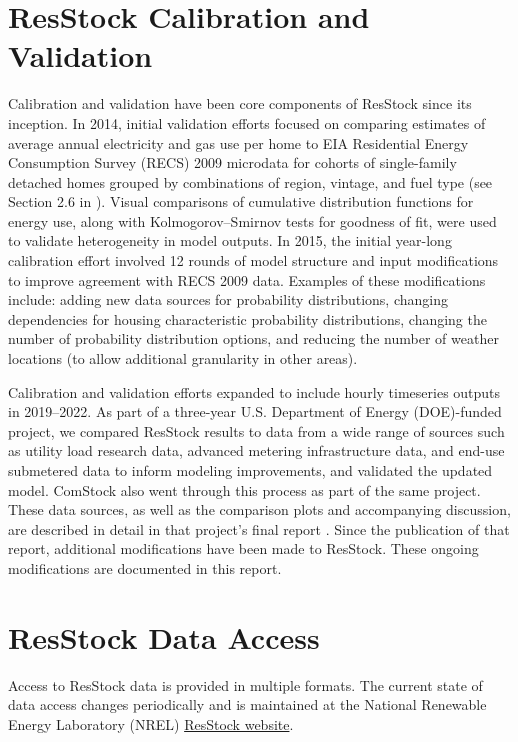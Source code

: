 \section{ResStock Calibration and Validation}
Calibration and validation have been core components of ResStock since its inception. In 2014, initial validation efforts focused on comparing estimates of average annual electricity and gas use per home to EIA Residential Energy Consumption Survey (RECS) 2009 microdata for cohorts of single-family detached homes grouped by combinations of region, vintage, and fuel type (see Section 2.6 in \cite{Wilson2017}). Visual comparisons of cumulative distribution functions for energy use, along with Kolmogorov–Smirnov tests for goodness of fit, were used to validate heterogeneity in model outputs. In 2015, the initial year-long calibration effort involved 12 rounds of model structure and input modifications to improve agreement with RECS 2009 data. Examples of these modifications include: adding new data sources for probability distributions, changing dependencies for housing characteristic probability distributions, changing the number of probability distribution options, and reducing the number of weather locations (to allow additional granularity in other areas). 

Calibration and validation efforts expanded to include hourly timeseries outputs in 2019--2022. As part of a three-year U.S. Department of Energy (DOE)-funded project, we compared ResStock results to data from a wide range of sources such as utility load research data, advanced metering infrastructure data, and end-use submetered data to inform modeling improvements, and validated the updated model. ComStock also went through this process as part of the same project. These data sources, as well as the comparison plots and accompanying discussion, are described in detail in that project’s final report \citep{Wilson2022}. Since the publication of that report, additional modifications have been made to ResStock. These ongoing modifications are documented in this report.


\section{ResStock Data Access}

Access to ResStock data is provided in multiple formats. The current state of data access changes periodically and is maintained at the National Renewable Energy Laboratory (NREL) \href{https://resstock.nlr.gov/datasets}{ResStock website}.



